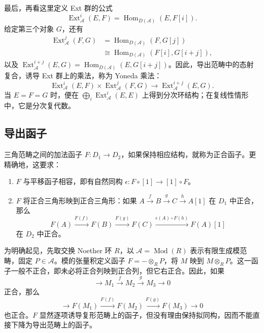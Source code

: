 最后，再看这里定义 Ext 群的公式
\[
\operatorname{Ext}^i_{\mathcal{A}}(E,F)=\operatorname{Hom}_{D(\mathcal{A})}(E,F[i]).
\]
给定第三个对象 $G$，还有
\[
\begin{aligned}
\operatorname{Ext}^j_{\mathcal{A}}(F,G)
&=\operatorname{Hom}_{D(\mathcal{A})}(F,G[j])\\
&\cong\operatorname{Hom}_{D(\mathcal{A})}(F[i],G[i+j]),
\end{aligned}
\]
以及 $\operatorname{Ext}^{i+j}_{\mathcal{A}}(E,G)=\operatorname{Hom}_{D(\mathcal{A})}(E,G[i+j])$。因此，导出范畴中的态射复合，诱导 Ext 群上的乘法，称为 Yoneda 乘法：
\[
\operatorname{Ext}^i_{\mathcal{A}}(E,F)\times
\operatorname{Ext}^j_{\mathcal{A}}(F,G)
\longrightarrow\operatorname{Ext}^{i+j}_{\mathcal{A}}(E,G).
\]
当 $E=F=G$ 时，便在 $\bigoplus_i\operatorname{Ext}^i_{\mathcal{A}}(E,E)$ 上得到分次环结构；在复线性情形中，它是分次复代数。

\subsection{导出函子}\label{sec:4.4.5}

三角范畴之间的加法函子 $F\colon D_1\to D_2$，如果保持相应结构，就称为正合函子。更精确地，这要求：
\begin{definition*}\label{def:4.exact-triangulated-functor}
\begin{enumerate}[label=(\alph*)]
\item $F$ 与平移函子相容，即有自然同构 $\epsilon\colon F\circ[1]\to[1]\circ F$。
\item $F$ 将正合三角形映到正合三角形：如果 $A\xrightarrow{f}B\xrightarrow{g}C\xrightarrow{h}A[1]$ 在 $D_1$ 中正合，那么
\[
F(A)\xrightarrow{F(f)}F(B)\xrightarrow{F(g)}F(C)
\xrightarrow{\epsilon(A)\circ F(h)}F(A)[1]
\]
在 $D_2$ 中正合。
\end{enumerate}
\end{definition*}

为明确起见，先取交换 Noether 环 $R$，以 $\mathcal{A}=\operatorname{Mod}(R)$ 表示有限生成模范畴，固定 $P\in\mathcal{A}$。模的张量积定义函子 $F=-\otimes_RP$，将 $M$ 映到 $M\otimes_RP$。这一函子一般不正合，即未必将正合列映到正合列，但它右正合。因此，如果
\[
\longrightarrow M_1\xrightarrow{f}M_2\xrightarrow{g}M_3\longrightarrow0
\]
正合，那么
\[
\longrightarrow F(M_1)\xrightarrow{F(f)}F(M_2)
\xrightarrow{F(g)}F(M_3)\longrightarrow0
\]
也正合。$F$ 显然逐项诱导复形范畴上的函子，但没有理由保持拟同构，因而不能直接下降为导出范畴上的函子。

